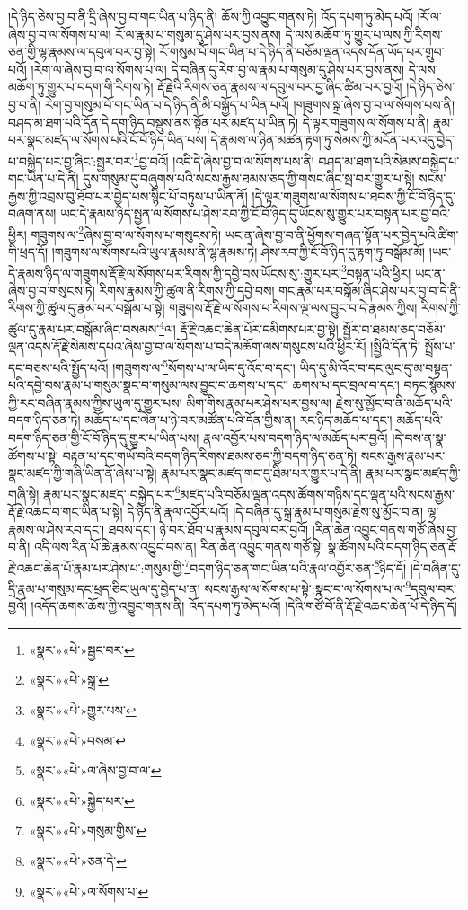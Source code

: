 །དེ་ཉིད་ཅེས་བྱ་བ་ནི་དྲི་ཞེས་བྱ་བ་གང་ཡིན་པ་ཉིད་ནི། ཆོས་ཀྱི་འབྱུང་གནས་ཏེ། འོད་དཔག་ཏུ་མེད་པའོ། །རོ་ལ་ཞེས་བྱ་བ་ལ་སོགས་པ་ལ། རོ་ལ་རྣམ་པ་གསུམ་དུ་ཤེས་པར་བྱས་ནས། དེ་ལས་མཆོག་ཏུ་གྱུར་པ་ལས་ཀྱི་རིགས་ཅན་གྱི་ལྷ་རྣམས་ལ་དབུལ་བར་བྱ་སྟེ། རོ་གསུམ་པོ་གང་ཡིན་པ་དེ་ཉིད་ནི་བཅོམ་ལྡན་འདས་དོན་ཡོད་པར་གྲུབ་པའོ། །རེག་ལ་ཞེས་བྱ་བ་ལ་སོགས་པ་ལ། དེ་བཞིན་དུ་རེག་བྱ་ལ་རྣམ་པ་གསུམ་དུ་ཤེས་པར་བྱས་ནས། དེ་ལས་མཆོག་ཏུ་གྱུར་པ་བདག་གི་རིགས་ཏེ། རྡོ་རྗེའི་རིགས་ཅན་རྣམས་ལ་དབུལ་བར་བྱ་ཞིང་ཚིམ་པར་བྱའོ། །དེ་ཉིད་ཅེས་བྱ་བ་ནི། རེག་བྱ་གསུམ་པོ་གང་ཡིན་པ་དེ་ཉིད་ནི་མི་བསྐྱོད་པ་ཡིན་པའོ། །གཟུགས་སྒྲ་ཞེས་བྱ་བ་ལ་སོགས་པས་ནི། བཤད་མ་ཐག་པའི་དོན་དེ་དག་ཉིད་བསྡུས་ནས་སྟོན་པར་མཛད་པ་ཡིན་ཏེ། དེ་ལྟར་གཟུགས་ལ་སོགས་པ་ནི། རྣམ་པར་སྣང་མཛད་ལ་སོགས་པའི་ངོ་བོ་ཉིད་ཡིན་པས། དེ་རྣམས་ལ་ཉིན་མཚན་རྟག་ཏུ་སེམས་ཀྱི་མངོན་པར་འདུ་བྱེད་པ་བསྐྱེད་པར་བྱ་ཞིང་:སྦྱར་བར་\footnote{«སྣར་»«པེ་»སྦྱང་བར་}བྱ་བའོ། །འདི་དེ་ཞེས་བྱ་བ་ལ་སོགས་པས་ནི། བཤད་མ་ཐག་པའི་སེམས་བསྐྱེད་པ་གང་ཡིན་པ་དེ་ནི། དུས་གསུམ་དུ་བཞུགས་པའི་སངས་རྒྱས་ཐམས་ཅད་ཀྱི་གསང་ཞིང་སྦ་བར་གྱུར་པ་སྟེ། སངས་རྒྱས་ཀྱི་འབྲས་བུ་ཐོབ་པར་བྱེད་པས་སྙིང་པོ་བཏུས་པ་ཡིན་ནོ། །དེ་ལྟར་གཟུགས་ལ་སོགས་པ་ཐབས་ཀྱི་ངོ་བོ་ཉིད་དུ་བཞག་ནས། ཡང་དེ་རྣམས་ཉིད་སྤྱན་ལ་སོགས་པ་ཤེས་རབ་ཀྱི་ངོ་བོ་ཉིད་དུ་ཡོངས་སུ་གྱུར་པར་བསྟན་པར་བྱ་བའི་ཕྱིར། གཟུགས་ལ་\footnote{«སྣར་»«པེ་»སྒྲ་}ཞེས་བྱ་བ་ལ་སོགས་པ་གསུངས་ཏེ། ཡང་ན་ཞེས་བྱ་བ་ནི་ཕྱོགས་གཞན་སྟོན་པར་བྱེད་པའི་ཚིག་གི་ཕྲད་དོ། །གཟུགས་ལ་སོགས་པའི་ཡུལ་རྣམས་ནི་ལྷ་རྣམས་ཏེ། ཤེས་རབ་ཀྱི་ངོ་བོ་ཉིད་དུ་རྟག་ཏུ་བསྒོམ་མོ། །ཡང་དེ་རྣམས་ཉིད་ལ་གཟུགས་རྡོ་རྗེ་ལ་སོགས་པར་རིགས་ཀྱི་དབྱེ་བས་ཡོངས་སུ་:གྱུར་པར་\footnote{«སྣར་»«པེ་»གྱུར་པས་}བསྟན་པའི་ཕྱིར། ཡང་ན་ཞེས་བྱ་བ་གསུངས་ཏེ། རིགས་རྣམས་ཀྱི་ཚུལ་ནི་རིགས་ཀྱི་དབྱེ་བས། གང་རྣམ་པར་བསྒོམ་ཞིང་ཤེས་པར་བྱ་བ་དེ་ནི་རིགས་ཀྱི་ཚུལ་དུ་རྣམ་པར་བསྒོམ་པ་སྟེ། གཟུགས་རྡོ་རྗེ་ལ་སོགས་པ་རིགས་ལྔ་ལས་བྱུང་བ་དེ་རྣམས་ཀྱིས། རིགས་ཀྱི་ཚུལ་དུ་རྣམ་པར་བསྒོམ་ཞིང་བསམས་\footnote{«སྣར་»«པེ་»བསམ་}ལ། རྡོ་རྗེ་འཆང་ཆེན་པོར་དམིགས་པར་བྱ་སྟེ། སྦྱོར་བ་ཐམས་ཅད་བཅོམ་ལྡན་འདས་རྡོ་རྗེ་སེམས་དཔའ་ཞེས་བྱ་བ་ལ་སོགས་པ་བདེ་མཆོག་ལས་གསུངས་པའི་ཕྱིར་རོ། །སྤྱིའི་དོན་ཏེ། སྤྲོས་པ་དང་བཅས་པའི་སྤྱོད་པའོ། །གཟུགས་ལ་\footnote{«སྣར་»«པེ་»ལ་ཞེས་བྱ་བ་ལ་}སོགས་པ་ལ་ཡིད་དུ་འོང་བ་དང་། ཡིད་དུ་མི་འོང་བ་དང་ལུང་དུ་མ་བསྟན་པའི་དབྱེ་བས་རྣམ་པ་གསུམ་སྣང་བ་གསུམ་ལས་བྱུང་བ་ཆགས་པ་དང་། ཆགས་པ་དང་བྲལ་བ་དང་། བཏང་སྙོམས་ཀྱི་རང་བཞིན་རྣམས་ཀྱིས་ཡུལ་དུ་གྱུར་པས། མིག་གིས་རྣམ་པར་ཤེས་པར་བྱས་ལ། རྗེས་སུ་མྱོང་བ་ནི་མཆོད་པའི་བདག་ཉིད་ཅན་ཏེ། མཆོད་པ་དང་ལེན་པ་ཉེ་བར་མཚོན་པའི་དོན་གྱིས་ན། རང་ཉིད་མཆོད་པ་དང་། མཆོད་པའི་བདག་ཉིད་ཅན་གྱི་ངོ་བོ་ཉིད་དུ་གྱུར་པ་ཡིན་པས། རྣལ་འབྱོར་པས་བདག་ཉིད་ལ་མཆོད་པར་བྱའོ། །དེ་བས་ན་སྣ་ཚོགས་པ་སྟེ། བརྟན་པ་དང་གཡོ་བའི་བདག་ཉིད་རིགས་ཐམས་ཅད་ཀྱི་བདག་ཉིད་ཅན་ཏེ། སངས་རྒྱས་རྣམ་པར་སྣང་མཛད་ཀྱི་གཞི་ཡིན་ནོ་ཞེས་པ་སྟེ། རྣམ་པར་སྣང་མཛད་གང་དུ་ཐིམ་པར་གྱུར་པ་དེ་ནི། རྣམ་པར་སྣང་མཛད་ཀྱི་གཞི་སྟེ། རྣམ་པར་སྣང་མཛད་:བསྐྱེད་པར་\footnote{«སྣར་»«པེ་»སྐྱེད་པར་}མཛད་པའི་བཅོམ་ལྡན་འདས་ཚོགས་གཉིས་དང་ལྡན་པའི་སངས་རྒྱས་རྡོ་རྗེ་འཆང་བ་གང་ཡིན་པ་སྟེ། དེ་ཉིད་ནི་རྣལ་འབྱོར་པའོ། །དེ་བཞིན་དུ་སྒྲ་རྣམ་པ་གསུམ་རྗེས་སུ་མྱོང་བ་ན། ལྷ་རྣམས་ལ་ཤེས་རབ་དང་། ཐབས་དང་། ཉེ་བར་ཐོབ་པ་རྣམས་དབུལ་བར་བྱའོ། །རིན་ཆེན་འབྱུང་གནས་གཙོ་ཞེས་བྱ་བ་ནི། འདི་ལས་རིན་པོ་ཆེ་རྣམས་འབྱུང་བས་ན། རིན་ཆེན་འབྱུང་གནས་གཙོ་སྟེ། སྣ་ཚོགས་པའི་བདག་ཉིད་ཅན་རྡོ་རྗེ་འཆང་ཆེན་པོ་རྣམ་པར་ཤེས་པ་:གསུམ་གྱི་\footnote{«སྣར་»«པེ་»གསུམ་གྱིས་}བདག་ཉིད་ཅན་གང་ཡིན་པའི་རྣལ་འབྱོར་ཅན་\footnote{«སྣར་»«པེ་»ཅན་དེ་}ཉིད་དོ། །དེ་བཞིན་དུ་དྲི་རྣམ་པ་གསུམ་དང་ཕྲད་ཅིང་ཡུལ་དུ་བྱེད་པ་ན། སངས་རྒྱས་ལ་སོགས་པ་སྟེ་:སྣང་བ་ལ་སོགས་པ་ལ་\footnote{«སྣར་»«པེ་»ལ་སོགས་པ་}དབུལ་བར་བྱའོ། །འདོད་ཆགས་ཆོས་ཀྱི་འབྱུང་གནས་ནི། འོད་དཔག་ཏུ་མེད་པའོ། །དེའི་གཙོ་བོ་ནི་རྡོ་རྗེ་འཆང་ཆེན་པོ་དེ་ཉིད་དོ། 